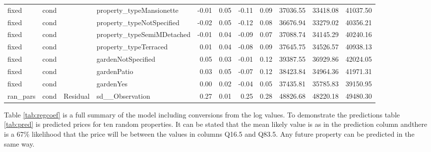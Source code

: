 \documentclass{scrartcl}
\begin{document}
\begin{landscape}
\begin{table}[htbp]
\begin{adjustbox}{max width=\linewidth}
\begin{tabular}{llllrrrrrrr}
			fixed & cond &  & property\_typeMansionette & -0.01 & 0.05 & -0.11 & 0.09 & 37036.55 & 33418.08 & 41037.50 \\ 
			fixed & cond &  & property\_typeNotSpecified & -0.02 & 0.05 & -0.12 & 0.08 & 36676.94 & 33279.02 & 40356.21 \\ 
			fixed & cond &  & property\_typeSemiMDetached & -0.01 & 0.04 & -0.09 & 0.07 & 37088.74 & 34145.29 & 40240.16 \\ 
			fixed & cond &  & property\_typeTerraced & 0.01 & 0.04 & -0.08 & 0.09 & 37645.75 & 34526.57 & 40938.13 \\ 
			fixed & cond &  & gardenNotSpecified & 0.05 & 0.03 & -0.01 & 0.12 & 39387.55 & 36929.86 & 42024.05 \\ 
			fixed & cond &  & gardenPatio & 0.03 & 0.05 & -0.07 & 0.12 & 38423.84 & 34964.36 & 41971.31 \\ 
			fixed & cond &  & gardenYes & 0.00 & 0.02 & -0.04 & 0.05 & 37435.81 & 35785.83 & 39150.95 \\ 
			ran\_pars & cond & Residual & sd\_\_Observation & 0.27 & 0.01 & 0.25 & 0.28 & 48826.68 & 48220.18 & 49480.30 \\ 
			\hline
		\end{tabular}
	\end{adjustbox}
	\end{table}
\end{landscape}


Table \ref*{tab:regcoef} is a full summary of the model including conversions from the log values. To demonstrate the predictions table \ref{tab:pred} is predicted prices for ten random properties. It can be stated that the mean likely value is as in the prediction column andthere is a 67\% likelihood that the price will be between the values in columns Q16.5 and Q83.5. Any future property can be predicted in the same way.
\end{document}
